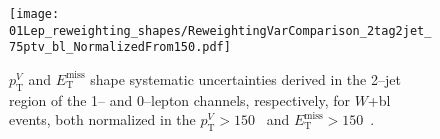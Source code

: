 \begin{figure}[ht!]
  \centering
  \texttt{[image: 01Lep\_reweighting\_shapes/ReweightingVarComparison\_2tag2jet\_75ptv\_bl\_NormalizedFrom150.pdf]}
  \caption[A normalised comparison of 0-- and 1--lepton channel derived $p_{\mathrm{T}}^V$ and
  $E_{\mathrm{T}}^{\text{miss}}$ shape systematic uncertainties on $W+$jets
  events.]{$p_{\mathrm{T}}^V$ and $E_{\mathrm{T}}^{\text{miss}}$ shape systematic uncertainties
    derived in the 2--jet region of the 1-- and 0--lepton channels,
    respectively, for $W$+bl events, both normalized in the $p_{\mathrm{T}}^V > 150$~\GeV
    and $E_{\mathrm{T}}^{\text{miss}} > 150$~\GeV.}
  \label{fig:wjets_01lep_2jet_bl_SysWPtVBDTr_From150}
\end{figure}